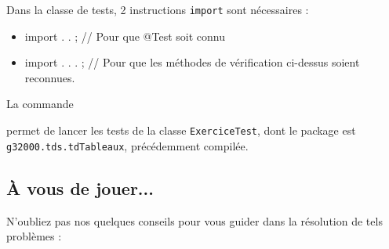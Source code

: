 \documentclass[11pt,a4paper]{article}
\begin{document}
            \par
        
                Dans la classe de tests, 2 instructions \verb|import| sont n\'ecessaires :    
							
					\begin{itemize}
				
			\item import  \textcolor{gray}{\underline{\hspace*{2em}}} . \textcolor{gray}{\underline{\hspace*{3em}}} . \textcolor{gray}{\underline{\hspace*{3em}}} ; 
                // Pour que @Test soit connu
                
			\item import  \textcolor{gray}{\underline{\hspace*{5em}}}  \textcolor{gray}{\underline{\hspace*{2em}}} . \textcolor{gray}{\underline{\hspace*{3em}}} . \textcolor{gray}{\underline{\hspace*{5em}}} . \textcolor{gray}{\underline{\hspace*{1em}}} ; 
                // Pour que les m\'ethodes de v\'erification ci-dessus soient reconnues.
                
					\end{itemize}
				
            \par
            
								La commande
								\par
				 \textcolor{gray}{\underline{\hspace*{3em}}}  \textcolor{gray}{\underline{\hspace*{16em}}}  \textcolor{gray}{\underline{\hspace*{20em}}}  \par
				
								permet de lancer les tests de la classe \verb|ExerciceTest|, 
								dont le package est \verb|g32000.tds.tdTableaux|, pr\'ec\'edemment compil\'ee.    
							
            \par
        \subsection{\`A vous de jouer...}
          N'oubliez pas nos quelques conseils pour vous guider dans la r\'esolution de tels probl\`emes :
          
\end{document}
